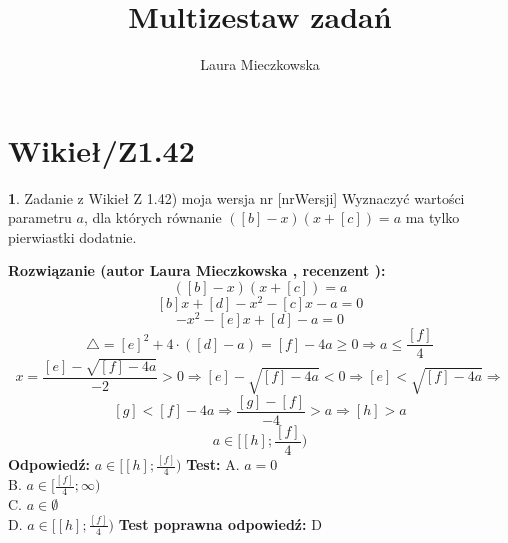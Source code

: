 \documentclass[12pt, a4paper]{article}
\title{Multizestaw zadań}
\author{Laura Mieczkowska}
\date{}
\theoremstyle{definition} %
\newtheorem{zad}{}
\newcommand{\kategoria}[1]{\section{#1}} %
\newcommand{\zadStart}[1]{\begin{zad}#1\newline} %
\newcommand{\zadStop}{\end{zad}}   %
\newcommand{\rozwStart}[2]{\noindent \textbf{Rozwiązanie (autor #1 , recenzent #2): }\newline} %
\newcommand{\odpStart}{\noindent \textbf{Odpowiedź:}\newline}    %
\newcommand{\odpStop}{\newline}                                             %
\newcommand{\testStart}{\noindent \textbf{Test:}\newline} %
\newcommand{\testStop}{\newline} %
\newcommand{\kluczStart}{\noindent \textbf{Test poprawna odpowiedź:}\newline} %
\newcommand{\kluczStop}{\newline} %
\begin{document}
\maketitle


\kategoria{Wikieł/Z1.42}
\zadStart{Zadanie z Wikieł Z 1.42) moja wersja nr [nrWersji]}
Wyznaczyć wartości parametru $a$, dla których równanie $([b]-x)(x+[c])=a$ ma tylko pierwiastki dodatnie.
\zadStop
\rozwStart{Laura Mieczkowska}{}
$$([b]-x)(x+[c])=a$$
$$[b]x+[d]-x^2-[c]x-a=0$$ 
$$-x^2-[e]x+[d]-a=0$$
$$\triangle=[e]^2+4\cdot([d]-a)=[f]-4a\geq0 \Rightarrow a\leq\frac{[f]}{4}$$
$$x=\frac{[e]-\sqrt{[f]-4a}}{-2}>0 \Rightarrow [e]-\sqrt{[f]-4a}<0 \Rightarrow [e]<\sqrt{[f]-4a} \Rightarrow$$
$$[g]<[f]-4a \Rightarrow \frac{[g]-[f]}{-4}>a \Rightarrow [h]>a$$
$$a\in\bigg[[h];\frac{[f]}{4}\bigg)$$
\odpStart
$a\in[[h];\frac{[f]}{4})$
\odpStop
\testStart
A. $a=0$ \\
B. $a\in[\frac{[f]}{4};\infty)$ \\
C. $a\in\emptyset$ \\
D. $a\in[[h];\frac{[f]}{4})$ 
\testStop
\kluczStart
D
\kluczStop
\end{document}
